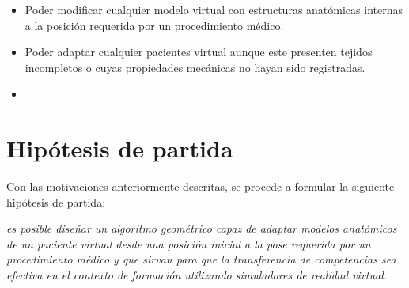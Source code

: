 \begin{itemize}
    \item Poder modificar cualquier modelo virtual con estructuras anatómicas internas a la posición requerida por un procedimiento médico.
    \item Poder adaptar cualquier pacientes virtual aunque este presenten tejidos incompletos o cuyas propiedades mecánicas no hayan sido registradas.
    \item {} 
\end{itemize}


\section{Hipótesis de partida} 
\label{intro:hipotesis}
Con las motivaciones anteriormente descritas, se procede a formular la siguiente hipótesis de partida:



\begin{center}
    \begin{minipage}{0.9\linewidth}
        {\small
\emph{es posible diseñar un algoritmo geométrico capaz de adaptar modelos anatómicos de un paciente virtual desde una posición inicial a la pose requerida por un procedimiento médico y que sirvan para que la transferencia de competencias sea efectiva en el contexto de formación utilizando simuladores de realidad virtual. }
        }
    \end{minipage}
    
    
\end{center}




